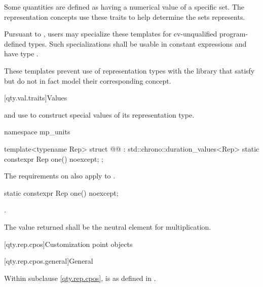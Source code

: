 \begin{itemdescr}
\pnum
Some quantities are defined as having a numerical value of a specific set.
The representation concepts use these traits
to help determine the sets  represents.

\pnum
\remarks
Pursuant to ,
users may specialize these templates
for cv-unqualified program-defined types.
Such specializations shall be usable in constant expressions
and have type .

\pnum
\begin{note}
These templates prevent use of representation types with the library
that satisfy but do not in fact model their corresponding concept.
\end{note}
\end{itemdescr}

[qty.val.traits]{Values}

\pnum
{} and  use 
to construct special values of its representation type.

\begin{codeblock}
namespace mp_units {

template<typename Rep>
struct @@ : std::chrono::duration_values<Rep> {
  static constexpr Rep one() noexcept;
};

}
\end{codeblock}

\pnum
The requirements on 
also apply to .

\begin{itemdecl}
static constexpr Rep one() noexcept;
\end{itemdecl}

\begin{itemdescr}
\pnum
\returns
{}.

\pnum
\remarks
The value returned shall be the neutral element for multiplication.
\end{itemdescr}

[qty.rep.cpos]{Customization point objects}

[qty.rep.cpos.general]{General}

\pnum
Within subclause \ref{qty.rep.cpos},
 is as defined in .


